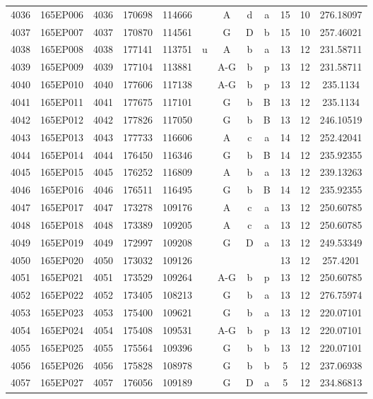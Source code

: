 \begin{tabular}{|*{12}{c|}}
4036 & 165EP006 & 4036 & 170698 & 114666 &  & A & d & a & 15 & 10 & 276.18097 \\ 
4037 & 165EP007 & 4037 & 170870 & 114561 &  & G & D & b & 15 & 10 & 257.46021 \\ 
4038 & 165EP008 & 4038 & 177141 & 113751 & u & A & b & a & 13 & 12 & 231.58711 \\ 
4039 & 165EP009 & 4039 & 177104 & 113881 &  & A-G & b & p & 13 & 12 & 231.58711 \\ 
4040 & 165EP010 & 4040 & 177606 & 117138 &  & A-G & b & p & 13 & 12 & 235.1134 \\ 
4041 & 165EP011 & 4041 & 177675 & 117101 &  & G & b & B & 13 & 12 & 235.1134 \\ 
4042 & 165EP012 & 4042 & 177826 & 117050 &  & G & b & B & 13 & 12 & 246.10519 \\ 
4043 & 165EP013 & 4043 & 177733 & 116606 &  & A & c & a & 14 & 12 & 252.42041 \\ 
4044 & 165EP014 & 4044 & 176450 & 116346 &  & G & b & B & 14 & 12 & 235.92355 \\ 
4045 & 165EP015 & 4045 & 176252 & 116809 &  & A & b & a & 13 & 12 & 239.13263 \\ 
4046 & 165EP016 & 4046 & 176511 & 116495 &  & G & b & B & 14 & 12 & 235.92355 \\ 
4047 & 165EP017 & 4047 & 173278 & 109176 &  & A & c & a & 13 & 12 & 250.60785 \\ 
4048 & 165EP018 & 4048 & 173389 & 109205 &  & A & c & a & 13 & 12 & 250.60785 \\ 
4049 & 165EP019 & 4049 & 172997 & 109208 &  & G & D & a & 13 & 12 & 249.53349 \\ 
4050 & 165EP020 & 4050 & 173032 & 109126 &  &  &  &  & 13 & 12 & 257.4201 \\ 
4051 & 165EP021 & 4051 & 173529 & 109264 &  & A-G & b & p & 13 & 12 & 250.60785 \\ 
4052 & 165EP022 & 4052 & 173405 & 108213 &  & G & b & a & 13 & 12 & 276.75974 \\ 
4053 & 165EP023 & 4053 & 175400 & 109621 &  & G & b & a & 13 & 12 & 220.07101 \\ 
4054 & 165EP024 & 4054 & 175408 & 109531 &  & A-G & b & p & 13 & 12 & 220.07101 \\ 
4055 & 165EP025 & 4055 & 175564 & 109396 &  & G & b & b & 13 & 12 & 220.07101 \\ 
4056 & 165EP026 & 4056 & 175828 & 108978 &  & G & b & b & 5 & 12 & 237.06938 \\ 
4057 & 165EP027 & 4057 & 176056 & 109189 &  & G & D & a & 5 & 12 & 234.86813 \\ 

\end{tabular}
